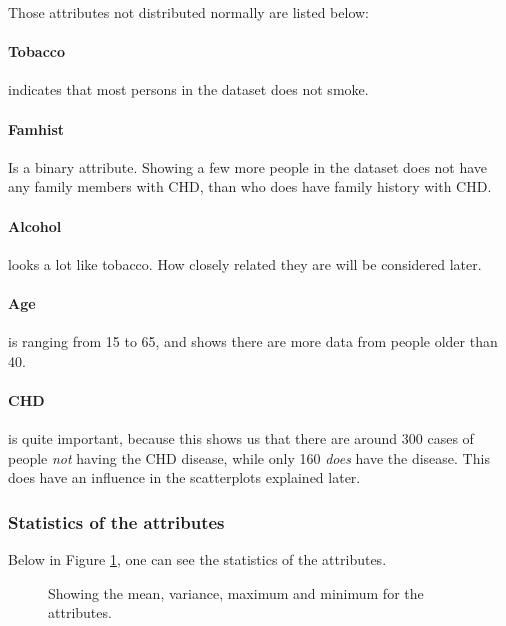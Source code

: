 Those attributes not distributed normally are listed below:
\paragraph{Tobacco} indicates that most persons in the dataset does not smoke.
\paragraph{Famhist} Is a binary attribute. Showing a few more people in the dataset does not have any family members with CHD, than who does have family history with CHD.
\paragraph{Alcohol} looks a lot like tobacco. How closely related they are will be considered later.
\paragraph{Age} is ranging from 15 to 65, and shows there are more data from people older than 40.
\paragraph{CHD} is quite important, because this shows us that there are around 300 cases of people \textit{not} having the CHD disease, while only 160 \textit{does} have the disease. This does have an influence in the scatterplots explained later.

\subsubsection{Statistics of the attributes}

Below in Figure \ref{statistics}, one can see the statistics of the attributes.

\begin{figure}[H]

\caption{Showing the mean, variance, maximum and minimum for the attributes.}
\label{statistics}
\end{figure}